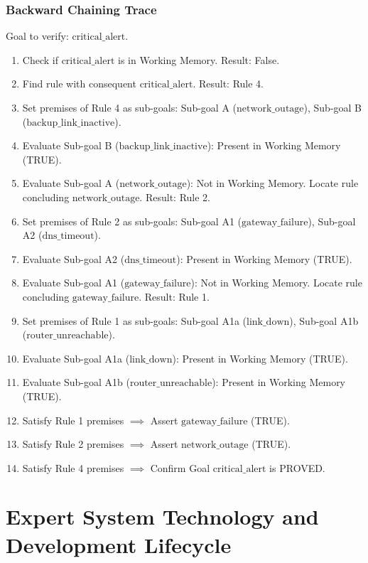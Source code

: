\documentclass[12pt]{report}
\begin{document}
\subsubsection{Backward Chaining Trace}

Goal to verify: $\text{critical\_alert}$.

\begin{enumerate}
    \item Check if $\text{critical\_alert}$ is in Working Memory. Result: False.
    \item Find rule with consequent $\text{critical\_alert}$. Result: Rule 4.
    \item Set premises of Rule 4 as sub-goals: Sub-goal A ($\text{network\_outage}$), Sub-goal B ($\text{backup\_link\_inactive}$).
    \item Evaluate Sub-goal B ($\text{backup\_link\_inactive}$): Present in Working Memory (TRUE).
    \item Evaluate Sub-goal A ($\text{network\_outage}$): Not in Working Memory. Locate rule concluding $\text{network\_outage}$. Result: Rule 2.
    \item Set premises of Rule 2 as sub-goals: Sub-goal A1 ($\text{gateway\_failure}$), Sub-goal A2 ($\text{dns\_timeout}$).
    \item Evaluate Sub-goal A2 ($\text{dns\_timeout}$): Present in Working Memory (TRUE).
    \item Evaluate Sub-goal A1 ($\text{gateway\_failure}$): Not in Working Memory. Locate rule concluding $\text{gateway\_failure}$. Result: Rule 1.
    \item Set premises of Rule 1 as sub-goals: Sub-goal A1a ($\text{link\_down}$), Sub-goal A1b ($\text{router\_unreachable}$).
    \item Evaluate Sub-goal A1a ($\text{link\_down}$): Present in Working Memory (TRUE).
    \item Evaluate Sub-goal A1b ($\text{router\_unreachable}$): Present in Working Memory (TRUE).
    \item Satisfy Rule 1 premises $\implies$ Assert $\text{gateway\_failure}$ (TRUE).
    \item Satisfy Rule 2 premises $\implies$ Assert $\text{network\_outage}$ (TRUE).
    \item Satisfy Rule 4 premises $\implies$ Confirm Goal $\text{critical\_alert}$ is PROVED.
\end{enumerate}

\section{Expert System Technology and Development Lifecycle}
\end{document}
